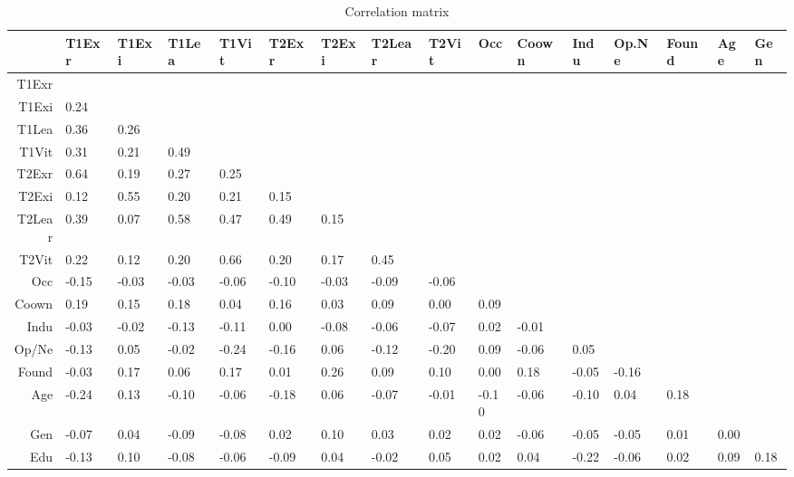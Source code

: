 \documentclass[man]{apa7}
\begin{document}
\begin{sidewaystable}[th]
\caption{Correlation matrix}
\centering
\begin{tabular}{rlllllllllllllll}
  \toprule
 & T1Exr & T1Exi & T1Lea & T1Vit & T2Exr & T2Exi & T2Lear & T2Vit & Occ & Coown & Indu & Op.Ne & Found & Age & Gen \\ 
  \midrule
T1Exr &  &  &  &  &  &  &  &  &  &  &  &  &  &  &  \\ 
  T1Exi &  0.24 &  &  &  &  &  &  &  &  &  &  &  &  &  &  \\ 
  T1Lea &  0.36 &  0.26 &  &  &  &  &  &  &  &  &  &  &  &  &  \\ 
  T1Vit &  0.31 &  0.21 &  0.49 &  &  &  &  &  &  &  &  &  &  &  &  \\ 
  T2Exr &  0.64 &  0.19 &  0.27 &  0.25 &  &  &  &  &  &  &  &  &  &  &  \\ 
  T2Exi &  0.12 &  0.55 &  0.20 &  0.21 &  0.15 &  &  &  &  &  &  &  &  &  &  \\ 
  T2Lear &  0.39 &  0.07 &  0.58 &  0.47 &  0.49 &  0.15 &  &  &  &  &  &  &  &  &  \\ 
  T2Vit &  0.22 &  0.12 &  0.20 &  0.66 &  0.20 &  0.17 &  0.45 &  &  &  &  &  &  &  &  \\ 
  Occ & -0.15 & -0.03 & -0.03 & -0.06 & -0.10 & -0.03 & -0.09 & -0.06 &  &  &  &  &  &  &  \\ 
  Coown &  0.19 &  0.15 &  0.18 &  0.04 &  0.16 &  0.03 &  0.09 &  0.00 &  0.09 &  &  &  &  &  &  \\ 
  Indu & -0.03 & -0.02 & -0.13 & -0.11 &  0.00 & -0.08 & -0.06 & -0.07 &  0.02 & -0.01 &  &  &  &  &  \\ 
  Op/Ne & -0.13 &  0.05 & -0.02 & -0.24 & -0.16 &  0.06 & -0.12 & -0.20 &  0.09 & -0.06 &  0.05 &  &  &  &  \\ 
  Found & -0.03 &  0.17 &  0.06 &  0.17 &  0.01 &  0.26 &  0.09 &  0.10 &  0.00 &  0.18 & -0.05 & -0.16 &  &  &  \\ 
  Age & -0.24 &  0.13 & -0.10 & -0.06 & -0.18 &  0.06 & -0.07 & -0.01 & -0.10 & -0.06 & -0.10 &  0.04 &  0.18 &  &  \\ 
  Gen & -0.07 &  0.04 & -0.09 & -0.08 &  0.02 &  0.10 &  0.03 &  0.02 &  0.02 & -0.06 & -0.05 & -0.05 &  0.01 &  0.00 &  \\ 
  Edu & -0.13 &  0.10 & -0.08 & -0.06 & -0.09 &  0.04 & -0.02 &  0.05 &  0.02 &  0.04 & -0.22 & -0.06 &  0.02 &  0.09 &  0.18 \\ 
   \bottomrule

\end{tabular}
\end{sidewaystable}
\end{document}
